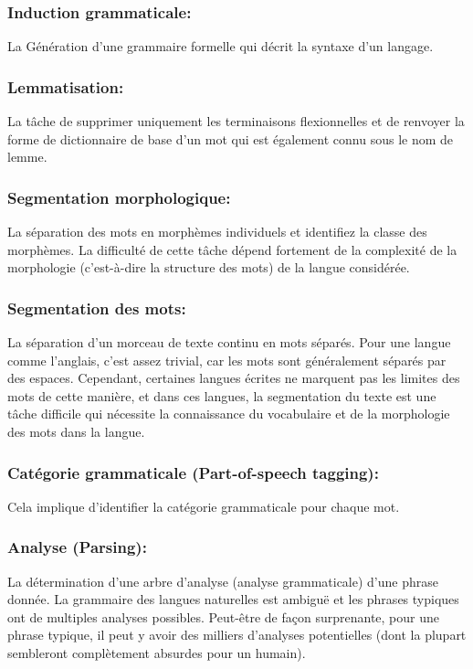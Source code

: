 \subsubsection{Induction grammaticale:}
La Génération d'une grammaire formelle qui décrit la syntaxe d'un langage. \\ \cite{klein2002natural}
\subsubsection{Lemmatisation:}
La tâche de supprimer uniquement les terminaisons flexionnelles et de renvoyer la forme de dictionnaire de base d'un mot qui est également connu sous le nom de lemme.
\subsubsection{Segmentation morphologique:}
La séparation des mots en morphèmes individuels et identifiez la classe des morphèmes. La difficulté de cette tâche dépend fortement de la complexité de la morphologie (c'est-à-dire la structure des mots) de la langue considérée.
\subsubsection{Segmentation des mots:}
La séparation d'un morceau de texte continu en mots séparés. Pour une langue comme l'anglais, c'est assez trivial, car les mots sont généralement séparés par des espaces. Cependant, certaines langues écrites ne marquent pas les limites des mots de cette manière, et dans ces langues, la segmentation du texte est une tâche difficile qui nécessite la connaissance du vocabulaire et de la morphologie des mots dans la langue.
\subsubsection{Catégorie grammaticale (Part-of-speech tagging):}
Cela implique d'identifier la catégorie grammaticale pour chaque mot.
\subsubsection{Analyse (Parsing):}
La détermination d'une arbre d'analyse (analyse grammaticale) d'une phrase donnée. La grammaire des langues naturelles est ambiguë et les phrases typiques ont de multiples analyses possibles. Peut-être de façon surprenante, pour une phrase typique, il peut y avoir des milliers d'analyses potentielles (dont la plupart sembleront complètement absurdes pour un humain).
